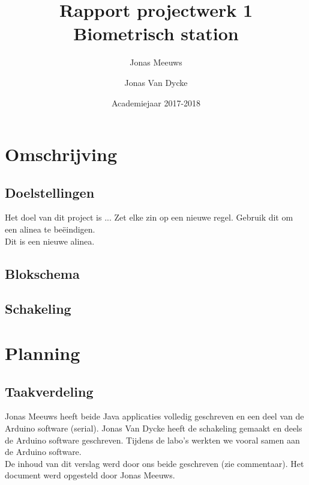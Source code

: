\documentclass[a4paper]{report}
\title{Rapport projectwerk 1\\ Biometrisch station}
\author{Jonas Meeuws \and Jonas Van Dycke}
\date{Academiejaar 2017-2018}
\begin{document}
\maketitle
\tableofcontents

\chapter{Omschrijving}
\section{Doelstellingen}
Het doel van dit project is ...
Zet elke zin op een nieuwe regel.
Gebruik dit om een alinea te beëindigen.\\

Dit is een nieuwe alinea.

\section{Blokschema}

\section{Schakeling}

\chapter{Planning}
\section{Taakverdeling}
Jonas Meeuws heeft beide Java applicaties volledig geschreven en een deel van de Arduino software (serial).
Jonas Van Dycke heeft de schakeling gemaakt en deels de Arduino software geschreven.
Tijdens de labo's werkten we vooral samen aan de Arduino software.\\
De inhoud van dit verslag werd door ons beide geschreven (zie commentaar).
Het document werd opgesteld door Jonas Meeuws.
\end{document}
